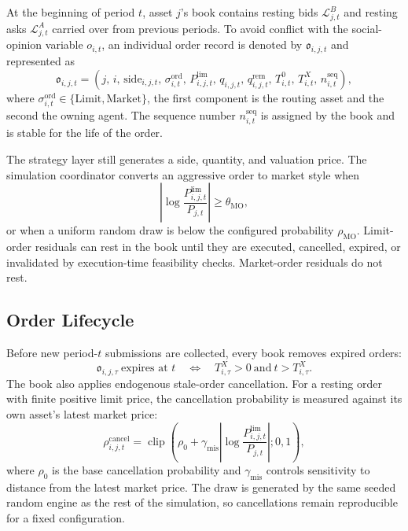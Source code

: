 \documentclass[12pt, a4paper]{article}
\DeclareMathOperator{\clip}{clip}
\begin{document}
    At the beginning of period \(t\), asset \(j\)'s book contains resting bids
    \(\mathcal{L}_{j,t}^{B}\) and resting asks \(\mathcal{L}_{j,t}^{A}\) carried
    over from previous periods. To avoid conflict with the social-opinion variable
    \(o_{i,t}\), an individual order record is denoted by \(\mathfrak{o}_{i,j,t}\)
    and represented as
    \[
        \mathfrak{o}_{i,j,t}=
        \left(
            j,\,
            i,\,
            \mathrm{side}_{i,j,t},\,
            \sigma_{i,t}^{\mathrm{ord}},\,
            P_{i,j,t}^{\text{lim}},\,
            q_{i,j,t},\,
            q_{i,j,t}^{\mathrm{rem}},\,
            T_{i,t}^{0},\,
            T_{i,t}^{X},\,
            n_{i,t}^{\mathrm{seq}}
        \right),
    \]
    where \(\sigma_{i,t}^{\mathrm{ord}}\in\{\mathrm{Limit},\mathrm{Market}\}\), the
    first component is the routing asset and the second the owning agent. The
    sequence number \(n_{i,t}^{\mathrm{seq}}\) is assigned by the book and is
    stable for the life of the order.

    The strategy layer still generates a side, quantity, and valuation price. The
    simulation coordinator converts an aggressive order to market style when
    \[
        \left|\log\frac{P_{i,j,t}^{\text{lim}}}{P_{j,t}}\right|
        \ge \theta_{\mathrm{MO}},
    \]
    or when a uniform random draw is below the configured probability
    \(\rho_{\mathrm{MO}}\). Limit-order residuals can rest in the book until they
    are executed, cancelled, expired, or invalidated by execution-time feasibility
    checks. Market-order residuals do not rest.

    \subsection{Order Lifecycle}

    Before new period-\(t\) submissions are collected, every book removes expired
    orders:
    \[
        \mathfrak{o}_{i,j,\tau}\ \text{expires at }t
        \quad\Longleftrightarrow\quad
        T_{i,\tau}^{X}>0\ \text{and}\ t>T_{i,\tau}^{X}.
    \]
    The book also applies endogenous stale-order cancellation. For a resting order
    with finite positive limit price, the cancellation probability is measured
    against its own asset's latest market price:
    \[
        \rho_{i,j,t}^{\mathrm{cancel}}
        =
        \clip\!\left(
                   \rho_0+\gamma_{\mathrm{mis}}
                   \left|\log\frac{P_{i,j,t}^{\text{lim}}}{P_{j,t}}\right|;
            0,1
        \right),
    \]
    where \(\rho_0\) is the base cancellation probability and
    \(\gamma_{\mathrm{mis}}\) controls sensitivity to distance from the latest
    market price. The draw is generated by the same seeded random engine as the
    rest of the simulation, so cancellations remain reproducible for a fixed
    configuration.
\end{document}
